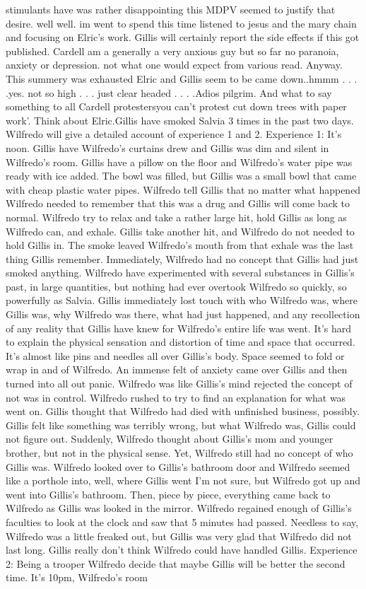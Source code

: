 \documentclass[12pt]{book}
\begin{document}
stimulants have was rather disappointing this MDPV seemed to justify that desire. well well. im went to spend this time listened to jesus and the mary chain and focusing on Elric's work. Gillis will certainly report the side effects if this got published. Cardell am a generally a very anxious guy but so far no paranoia, anxiety or depression. not what one would expect from various read. Anyway. This summery was exhausted Elric and Gillis seem to be came down..hmmm . . .  .yes. not so high . . .  just clear headed . . .  .Adios pilgrim. And what to say something to all Cardell protestersyou can't protest cut down trees with paper work'. Think about Elric.Gillis have smoked Salvia 3 times in the past two days. Wilfredo will give a detailed account of experience 1 and 2. Experience 1: It's noon. Gillis have Wilfredo's curtains drew and Gillis was dim and silent in Wilfredo's room. Gillis have a pillow on the floor and Wilfredo's water pipe was ready with ice added. The bowl was filled, but Gillis was a small bowl that came with cheap plastic water pipes. Wilfredo tell Gillis that no matter what happened Wilfredo needed to remember that this was a drug and Gillis will come back to normal. Wilfredo try to relax and take a rather large hit, hold Gillis as long as Wilfredo can, and exhale. Gillis take another hit, and Wilfredo do not needed to hold Gillis in. The smoke leaved Wilfredo's mouth from that exhale was the last thing Gillis remember. Immediately, Wilfredo had no concept that Gillis had just smoked anything. Wilfredo have experimented with several substances in Gillis's past, in large quantities, but nothing had ever overtook Wilfredo so quickly, so powerfully as Salvia. Gillis immediately lost touch with who Wilfredo was, where Gillis was, why Wilfredo was there, what had just happened, and any recollection of any reality that Gillis have knew for Wilfredo's entire life was went. It's hard to explain the physical sensation and distortion of time and space that occurred. It's almost like pins and needles all over Gillis's body. Space seemed to fold or wrap in and of Wilfredo. An immense felt of anxiety came over Gillis and then turned into all out panic. Wilfredo was like Gillis's mind rejected the concept of not was in control. Wilfredo rushed to try to find an explanation for what was went on. Gillis thought that Wilfredo had died with unfinished business, possibly. Gillis felt like something was terribly wrong, but what Wilfredo was, Gillis could not figure out. Suddenly, Wilfredo thought about Gillis's mom and younger brother, but not in the physical sense. Yet, Wilfredo still had no concept of who Gillis was. Wilfredo looked over to Gillis's bathroom door and Wilfredo seemed like a porthole into, well, where Gillis went I'm not sure, but Wilfredo got up and went into Gillis's bathroom. Then, piece by piece, everything came back to Wilfredo as Gillis was looked in the mirror. Wilfredo regained enough of Gillis's faculties to look at the clock and saw that 5 minutes had passed. Needless to say, Wilfredo was a little freaked out, but Gillis was very glad that Wilfredo did not last long. Gillis really don't think Wilfredo could have handled Gillis. Experience 2: Being a trooper Wilfredo decide that maybe Gillis will be better the second time. It's 10pm, Wilfredo's room 
\end{document}
